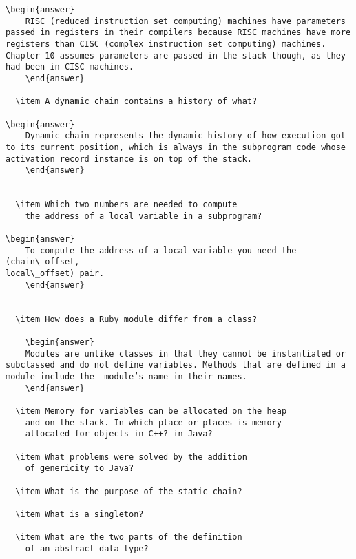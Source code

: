 \begin{enumerate}
\begin{answer}
\begin{lstlisting}
\begin{answer}
    RISC (reduced instruction set computing) machines have parameters passed in registers in their compilers because RISC machines have more registers than CISC (complex instruction set computing) machines. Chapter 10 assumes parameters are passed in the stack though, as they had been in CISC machines.
    \end{answer}

  \item A dynamic chain contains a history of what?

\begin{answer}
    Dynamic chain represents the dynamic history of how execution got to its current position, which is always in the subprogram code whose activation record instance is on top of the stack.
    \end{answer}
 

  \item Which two numbers are needed to compute
    the address of a local variable in a subprogram?

\begin{answer}
    To compute the address of a local variable you need the (chain\_offset, 
local\_offset) pair.
    \end{answer}


  \item How does a Ruby module differ from a class?

    \begin{answer}
    Modules are unlike classes in that they cannot be instantiated or subclassed and do not define variables. Methods that are defined in a module include the  module’s name in their names.
    \end{answer}

  \item Memory for variables can be allocated on the heap
    and on the stack. In which place or places is memory
    allocated for objects in C++? in Java?

  \item What problems were solved by the addition
    of genericity to Java?

  \item What is the purpose of the static chain?

  \item What is a singleton?

  \item What are the two parts of the definition 
    of an abstract data type?


\end{lstlisting}
\end{answer}
\end{enumerate}
